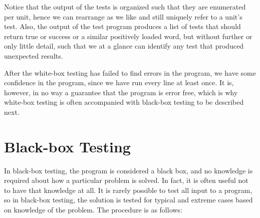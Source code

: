 \documentclass[fsharpnotes.tex]{subfiles}
\begin{document}
Notice that the output of the tests is organized such that they are enumerated per unit, hence we can rearrange as we like and still uniquely refer to a unit's test. Also, the output of the test program produces a list of tests that should return true or success or a similar positively loaded word, but without further or only little detail, such that we at a glance can identify any test that produced unexpected results.

After the white-box testing has failed to find errors in the program, we have some confidence in the program, since we have run every line at least once. It is, however, in no way a guarantee that the program is error free, which is why white-box testing is often accompanied with black-box testing to be described next.

\section{Black-box Testing}
In black-box testing, the program is considered a black box, and no knowledge is required about how a particular problem is solved. In fact, it is often useful not to have that knowledge at all. It is rarely possible to test all input to a program, so in black-box testing, the solution is tested for typical and extreme cases based on knowledge of the problem. The procedure is as follows:
\end{document}
